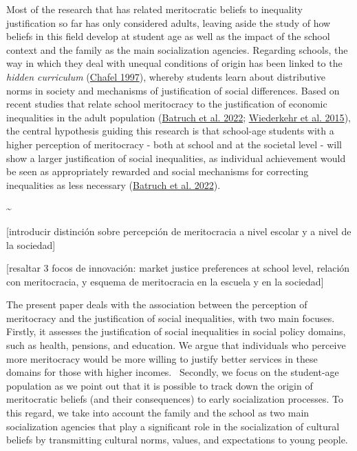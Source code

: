 \documentclass[
  letterpaper,
  DIV=11,
  numbers=noendperiod]{scrartcl}
\begin{document}
Most of the research that has related meritocratic beliefs to inequality
justification so far has only considered adults, leaving aside the study
of how beliefs in this field develop at student age as well as the
impact of the school context and the family as the main socialization
agencies. Regarding schools, the way in which they deal with unequal
conditions of origin has been linked to the \emph{hidden curriculum}
(\protect\hyperlink{ref-chafel_schooling_1997}{Chafel 1997}), whereby
students learn about distributive norms in society and mechanisms of
justification of social differences. Based on recent studies that relate
school meritocracy to the justification of economic inequalities in the
adult population (\protect\hyperlink{ref-batruch_belief_2022}{Batruch et
al. 2022}; \protect\hyperlink{ref-wiederkehr_belief_2015}{Wiederkehr et
al. 2015}), the central hypothesis guiding this research is that
school-age students with a higher perception of meritocracy - both at
school and at the societal level - will show a larger justification of
social inequalities, as individual achievement would be seen as
appropriately rewarded and social mechanisms for correcting inequalities
as less necessary (\protect\hyperlink{ref-batruch_belief_2022}{Batruch
et al. 2022}).

\textasciitilde{}

{[}introducir distinción sobre percepción de meritocracia a nivel
escolar y a nivel de la sociedad{]}

{[}resaltar 3 focos de innovación: market justice preferences at school
level, relación con meritocracia, y esquema de meritocracia en la
escuela y en la sociedad{]}

The present paper deals with the association between the perception of
meritocracy and the justification of social inequalities, with two main
focuses. Firstly, it assesses the justification of social inequalities
in social policy domains, such as health, pensions, and education. We
argue that individuals who perceive more meritocracy would be more
willing to justify better services in these domains for those with
higher incomes.~ Secondly, we focus on the student-age population as we
point out that it is possible to track down the origin of meritocratic
beliefs (and their consequences) to early socialization processes. To
this regard, we take into account the family and the school as two main
socialization agencies that play a significant role in the socialization
of cultural beliefs by transmitting cultural norms, values, and
expectations to young people.~
\end{document}
